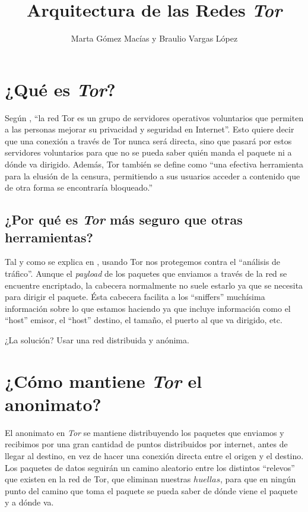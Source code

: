 \documentclass[10pt,a4paper,spanish]{article}
\title{\Huge Arquitectura de las Redes \textit{Tor}}
\author{\Large Marta Gómez Macías y Braulio Vargas López}
\begin{document}
\renewcommand{\tablename}{Tabla}
\maketitle

\section{¿Qué es \textit{Tor}?}
Según \cite{deftor}, ``la red Tor es un grupo de servidores operativos voluntarios que permiten a las personas mejorar su privacidad y seguridad en Internet''. Esto quiere decir que una conexión a través de Tor nunca será directa, sino que pasará por estos servidores voluntarios para que no se pueda saber quién manda el paquete ni a dónde va dirigido. Además, Tor también se define como ``una efectiva herramienta para la elusión de la censura, permitiendo a sus usuarios acceder a contenido que de otra forma se encontraría bloqueado.''

\subsection{¿Por qué es \textit{Tor} más seguro que otras herramientas?}
Tal y como se explica en \cite{deftor}, usando Tor nos protegemos contra el ``análisis de tráfico''. Aunque el \textit{payload} de los paquetes que enviamos a través de la red se encuentre encriptado, la cabecera normalmente no suele estarlo ya que se necesita para dirigir el paquete. Ésta cabecera facilita a los ``sniffers'' muchísima información sobre lo que estamos haciendo ya que incluye información como el ``host'' emisor, el ``host'' destino, el tamaño, el puerto al que va dirigido, etc.

¿La solución? Usar una red distribuida y anónima.

\section{¿Cómo mantiene \textit{Tor} el anonimato?}

El anonimato en \textit{Tor} se mantiene distribuyendo los paquetes que enviamos y recibimos por una gran cantidad de puntos distribuidos por internet, antes de llegar al destino, en vez de hacer una conexión directa entre el origen y el destino. Los paquetes de datos seguirán un camino aleatorio entre los distintos ``relevos'' que existen en la red de Tor, que eliminan nuestras $huellas$, para que en ningún punto del camino que toma el paquete se pueda saber de dónde viene el paquete y a dónde va.
\end{document}
